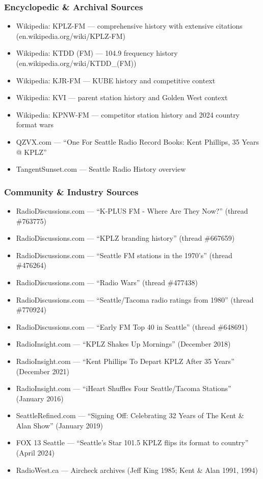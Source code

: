 \documentclass[11pt,letterpaper]{article}
\begin{document}
\subsubsection{Encyclopedic \& Archival Sources}
\begin{itemize}[leftmargin=2em]
\item Wikipedia: KPLZ-FM --- comprehensive history with extensive citations (en.wikipedia.org/wiki/KPLZ-FM)
\item Wikipedia: KTDD (FM) --- 104.9 frequency history (en.wikipedia.org/wiki/KTDD\_(FM))
\item Wikipedia: KJR-FM --- KUBE history and competitive context
\item Wikipedia: KVI --- parent station history and Golden West context
\item Wikipedia: KPNW-FM --- competitor station history and 2024 country format wars
\item QZVX.com --- ``One For Seattle Radio Record Books: Kent Phillips, 35 Years @ KPLZ''
\item TangentSunset.com --- Seattle Radio History overview
\end{itemize}

\subsubsection{Community \& Industry Sources}
\begin{itemize}[leftmargin=2em]
\item RadioDiscussions.com --- ``K-PLUS FM - Where Are They Now?'' (thread \#763775)
\item RadioDiscussions.com --- ``KPLZ branding history'' (thread \#667659)
\item RadioDiscussions.com --- ``Seattle FM stations in the 1970's'' (thread \#476264)
\item RadioDiscussions.com --- ``Radio Wars'' (thread \#477438)
\item RadioDiscussions.com --- ``Seattle/Tacoma radio ratings from 1980'' (thread \#770924)
\item RadioDiscussions.com --- ``Early FM Top 40 in Seattle'' (thread \#648691)
\item RadioInsight.com --- ``KPLZ Shakes Up Mornings'' (December 2018)
\item RadioInsight.com --- ``Kent Phillips To Depart KPLZ After 35 Years'' (December 2021)
\item RadioInsight.com --- ``iHeart Shuffles Four Seattle/Tacoma Stations'' (January 2016)
\item SeattleRefined.com --- ``Signing Off: Celebrating 32 Years of The Kent \& Alan Show'' (January 2019)
\item FOX 13 Seattle --- ``Seattle's Star 101.5 KPLZ flips its format to country'' (April 2024)
\item RadioWest.ca --- Aircheck archives (Jeff King 1985; Kent \& Alan 1991, 1994)
\end{itemize}
\end{document}

